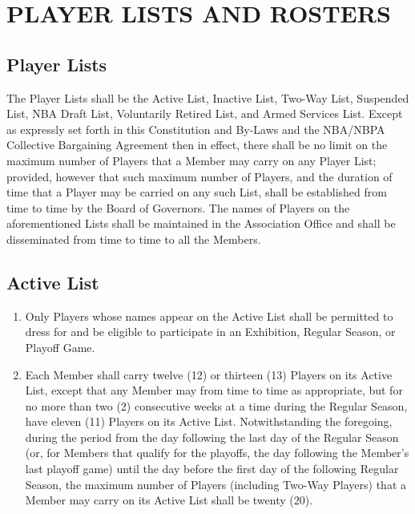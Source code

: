 \documentclass[]{book}
\providecommand{\tightlist}{%
  \setlength{\itemsep}{0pt}\setlength{\parskip}{0pt}}
\begin{document}
\hypertarget{player-lists-and-rosters}{%
\section{PLAYER LISTS AND ROSTERS}\label{player-lists-and-rosters}}

\hypertarget{player-lists}{%
\subsection{Player Lists}\label{player-lists}}

The Player Lists shall be the Active List, Inactive List, Two-Way List, Suspended List, NBA Draft List, Voluntarily Retired List, and Armed Services List. Except as expressly set forth in this Constitution and By-Laws and the NBA/NBPA Collective Bargaining Agreement then in effect, there shall be no limit on the maximum number of Players that a Member may carry on any Player List; provided, however that such maximum number of Players, and the duration of time that a Player may be carried on any such List, shall be established from time to time by the Board of Governors. The names of Players on the aforementioned Lists shall be maintained in the Association Office and shall be disseminated from time to time to all the Members.

\hypertarget{active-list}{%
\subsection{Active List}\label{active-list}}

\begin{enumerate}
\def\labelenumi{(\alph{enumi})}
\tightlist
\item
  Only Players whose names appear on the Active List shall be permitted to dress for and be eligible to participate in an Exhibition, Regular Season, or Playoff Game.
\item
  Each Member shall carry twelve (12) or thirteen (13) Players on its Active List, except that any Member may from time to time as appropriate, but for no more than two (2) consecutive weeks at a time during the Regular Season, have eleven (11) Players on its Active List. Notwithstanding the foregoing, during the period from the day following the last day of the Regular Season (or, for Members that qualify for the playoffs, the day following the Member's last playoff game) until the day before the first day of the following Regular Season, the maximum number of Players (including Two-Way Players) that a Member may carry on its Active List shall be twenty (20).
\end{enumerate}
\end{document}
